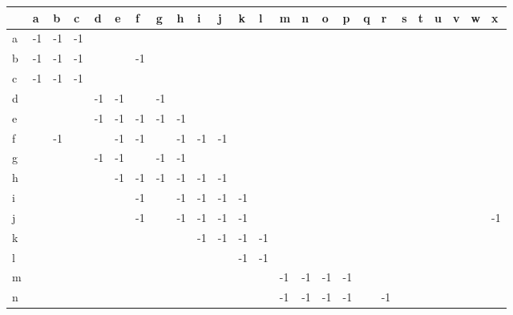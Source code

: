 \documentclass[12pt]{article}
\begin{document}
\begin{table}[h]
\begin{tabular}{|l|l|l|l|l|l|l|l|l|l|l|l|l|l|l|l|l|l|l|l|l|l|l|l|l|}
\hline
 & a  & b  & c  & d  & e  & f  & g  & h  & i  & j  & k  & l  & m  & n  & o  & p  & q  & r  & s  & t  & u  & v  & w  & x  \\ \hline
a & -1 & -1 & -1 &    &    &    &    &    &    &    &    &    &    &    &    &    &    &    &    &    &    &    &    &    \\ \hline
b & -1 & -1 & -1 &    &    & -1 &    &    &    &    &    &    &    &    &    &    &    &    &    &    &    &    &    &    \\ \hline
c & -1 & -1 & -1 &    &    &    &    &    &    &    &    &    &    &    &    &    &    &    &    &    &    &    &    &    \\ \hline
d &    &    &    & -1 & -1 &    & -1 &    &    &    &    &    &    &    &    &    &    &    &    &    &    &    &    &    \\ \hline
e &    &    &    & -1 & -1 & -1 & -1 & -1 &    &    &    &    &    &    &    &    &    &    &    &    &    &    &    &    \\ \hline
f &    & -1 &    &    & -1 & -1 &    & -1 & -1 & -1 &    &    &    &    &    &    &    &    &    &    &    &    &    &    \\ \hline
g &    &    &    & -1 & -1 &    & -1 & -1 &    &    &    &    &    &    &    &    &    &    &    &    &    &    &    &    \\ \hline
h &    &    &    &    & -1 & -1 & -1 & -1 & -1 & -1 &    &    &    &    &    &    &    &    &    &    &    &    &    &    \\ \hline
i &    &    &    &    &    & -1 &    & -1 & -1 & -1 & -1 &    &    &    &    &    &    &    &    &    &    &    &    &    \\ \hline
j &    &    &    &    &    & -1 &    & -1 & -1 & -1 & -1 &    &    &    &    &    &    &    &    &    &    &    &    & -1 \\ \hline
k &    &    &    &    &    &    &    &    & -1 & -1 & -1 & -1 &    &    &    &    &    &    &    &    &    &    &    &    \\ \hline
l &    &    &    &    &    &    &    &    &    &    & -1 & -1 &    &    &    &    &    &    &    &    &    &    &    &    \\ \hline
m &    &    &    &    &    &    &    &    &    &    &    &    & -1 & -1 & -1 & -1 &    &    &    &    &    &    &    &    \\ \hline
n &    &    &    &    &    &    &    &    &    &    &    &    & -1 & -1 & -1 & -1 &    & -1 &    &    &    &    &    &    \\ \hline

\end{tabular}
\end{table}
\end{document}
